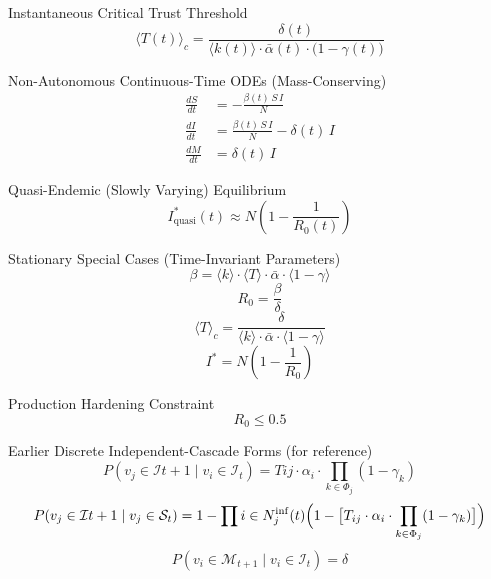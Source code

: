Instantaneous Critical Trust Threshold
\[
\langle T(t) \rangle_c = \frac{\delta(t)}{\langle k(t) \rangle \cdot \bar{\alpha}(t) \cdot \bigl(1 - \gamma(t)\bigr)}
\]

Non-Autonomous Continuous-Time ODEs (Mass-Conserving)
\begin{align*}
\frac{dS}{dt} &= -\frac{\beta(t)\, S\, I}{N} \\
\frac{dI}{dt} &= \frac{\beta(t)\, S\, I}{N} - \delta(t)\, I \\
\frac{dM}{dt} &= \delta(t)\, I
\end{align*}

Quasi-Endemic (Slowly Varying) Equilibrium
\[
I_{\mathrm{quasi}}^*(t) \approx N \left(1 - \frac{1}{R_0(t)}\right)
\]

Stationary Special Cases (Time-Invariant Parameters)
\[
\beta = \langle k \rangle \cdot \langle T \rangle \cdot \bar{\alpha} \cdot \langle 1 - \gamma \rangle
\]
\[
R_0 = \frac{\beta}{\delta}
\]
\[
\langle T \rangle_c = \frac{\delta}{\langle k \rangle \cdot \bar{\alpha} \cdot \langle 1 - \gamma \rangle}
\]
\[
I^* = N \left(1 - \frac{1}{R_0}\right)
\]

Production Hardening Constraint
\[
R_0 \le 0.5
\]

Earlier Discrete Independent-Cascade Forms (for reference)
\[
P(v_j \in \mathcal{I}{t+1} \mid v_i \in \mathcal{I}_t) = T{ij} \cdot \alpha_i \cdot \prod_{k \in \Phi_j} (1 - \gamma_k)
\]
\[
P(v_j \in \mathcal{I}{t+1} \mid v_j \in \mathcal{S}_t) = 1 - \prod{i \in N_j^{\mathrm{inf}}(t)} \Bigl(1 - \bigl[T_{ij} \cdot \alpha_i \cdot \prod_{k \in \Phi_j} (1 - \gamma_k)\bigr]\Bigr)
\]
\[
P(v_i \in \mathcal{M}_{t+1} \mid v_i \in \mathcal{I}_t) = \delta
\]
